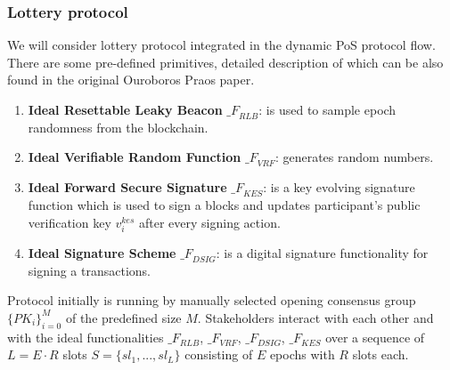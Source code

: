 \subsubsection{Lottery protocol}
We will consider lottery protocol integrated in the dynamic PoS protocol flow.
There are some pre-defined primitives, detailed description of which can be also found in the original Ouroboros Praos paper.
\begin{enumerate}
    \item \textbf{Ideal Resettable Leaky Beacon} ${\mathcal_{F}}_{RLB}$: is used to sample epoch randomness from the blockchain.
    \item \textbf{Ideal Verifiable Random Function} ${\mathcal_{F}}_{VRF}$: generates random numbers.
    \item \textbf{Ideal Forward Secure Signature} ${\mathcal_{F}}_{KES}$: is a key evolving signature function which is used to sign a blocks and updates participant's public verification key $v_i^{kes}$ after every signing action.
    \item \textbf{Ideal Signature Scheme} ${\mathcal_{F}}_{DSIG}$: is a digital signature functionality for signing a transactions.
\end{enumerate}
Protocol initially is running by manually selected opening consensus group $\{PK_i\}_{i=0}^M$ of the predefined size $M$.
Stakeholders interact with each other and with the ideal functionalities ${\mathcal_{F}}_{RLB}$, ${\mathcal_{F}}_{VRF}$, ${\mathcal_{F}}_{DSIG}$, ${\mathcal_{F}}_{KES}$ over a sequence of $L = E \cdot R$ slots  ${S=\{sl_1,...,sl_L\}}$ consisting of $E$ epochs with $R$ slots each.
